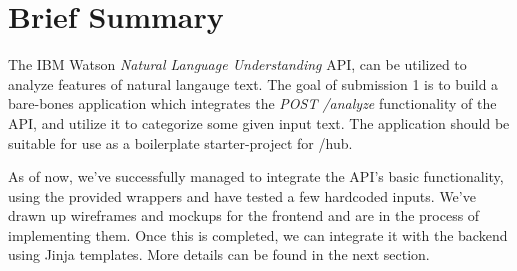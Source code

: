 \documentclass[12pt]{article}
\begin{document}
\maketitle


\section{Brief Summary}
The IBM Watson \emph{Natural Language Understanding} API, can be utilized to analyze features of natural langauge text. The goal of submission 1 is to build a bare-bones application which integrates the \emph{POST /analyze} functionality of the API, and utilize it to categorize some given input text. The application should be suitable for use as a boilerplate starter-project for /hub.

As of now, we've successfully managed to integrate the API's basic functionality, using the provided wrappers and have tested a few hardcoded inputs. We've drawn up wireframes and mockups for the frontend and are in the process of implementing them. Once this is completed, we can integrate it with the backend using Jinja templates. More details can be found in the next section. 
\end{document}
